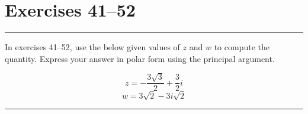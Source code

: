 \section{Exercises 41--52}

\medskip \hrule \medskip 

In exercises 41--52, use the below given values of $z$ and $w$ to compute the quantity. Express your answer in polar form using the principal argument.

\[\boxed{z = -\frac{3\sqrt{3}}{2} + \frac{3}{2} i}\]
\[\boxed{w = 3\sqrt{2} - 3 i \sqrt{2}}\]

\medskip \hrule \medskip 
